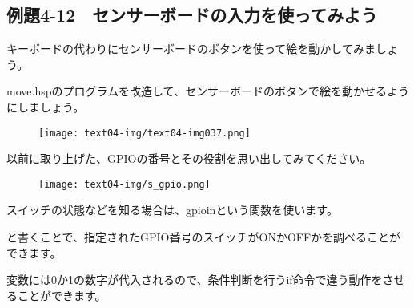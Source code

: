 \newpage
\subsection{例題4-12　センサーボードの入力を使ってみよう}


\begin{description}
    \item {}
\end{description}

キーボードの代わりにセンサーボードのボタンを使って絵を動かしてみましょう。

move.hspのプログラムを改造して、センサーボードのボタンで絵を動かせるようにしましょう。

\begin{figure}[H]
    \begin{center}
      \texttt{[image: text04-img/text04-img037.png]}
    \end{center}
    \label{fig:prog_menu}
\end{figure}

\begin{description}
    \item {}
\end{description}

以前に取り上げた、GPIOの番号とその役割を思い出してみてください。


\begin{figure}[H]
    \begin{center}
      \texttt{[image: text04-img/s\_gpio.png]}
    \end{center}
    \label{fig:prog_menu}
\end{figure}

スイッチの状態などを知る場合は、gpioinという関数を使います。

\begin{description}
    \item {}
\end{description}

と書くことで、指定されたGPIO番号のスイッチがONかOFFかを調べることができます。

変数には0か1の数字が代入されるので、条件判断を行うif命令で違う動作をさせることができます。


\begin{description}
    \item {}
    \item {}
\end{description}

